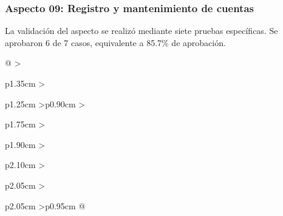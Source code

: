 \subsubsection{Aspecto 09: Registro y mantenimiento de cuentas}
La validación del aspecto se realizó mediante siete pruebas específicas. Se aprobaron 6 de 7 casos, equivalente a 85.7\% de aprobación.

\begingroup\fontsize{8}{10}\selectfont\renewcommand{\arraystretch}{1.25}\setlength{\tabcolsep}{2pt}
\begin{xltabular}{\linewidth}{@{}
>{\raggedright\arraybackslash}p{1.35cm}
>{\raggedright\arraybackslash}p{1.25cm}
>{\centering\arraybackslash}p{0.90cm}
>{\raggedright\arraybackslash}p{1.75cm}
>{\raggedright\arraybackslash}p{1.90cm}
>{\raggedright\arraybackslash}p{2.10cm}
>{\raggedright\arraybackslash}p{2.05cm}
>{\raggedright\arraybackslash}p{2.05cm}
>{\centering\arraybackslash}p{0.95cm}
@{}}


\end{xltabular}

